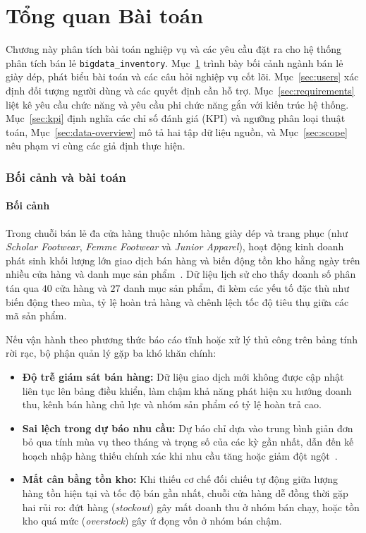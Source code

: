 \setcounter{page}{1}
\fancyfoot[C]{}
\part{Tổng quan Bài toán}
\label{part:ch1}

Chương này phân tích bài toán nghiệp vụ và các yêu cầu đặt ra cho hệ thống phân tích bán lẻ \texttt{bigdata_inventory}. Mục~\ref{sec:ch1-context} trình bày bối cảnh ngành bán lẻ giày dép, phát biểu bài toán và các câu hỏi nghiệp vụ cốt lõi. Mục~\ref{sec:users} xác định đối tượng người dùng và các quyết định cần hỗ trợ. Mục~\ref{sec:requirements} liệt kê yêu cầu chức năng và yêu cầu phi chức năng gắn với kiến trúc hệ thống. Mục~\ref{sec:kpi} định nghĩa các chỉ số đánh giá (KPI) và ngưỡng phân loại thuật toán, Mục~\ref{sec:data-overview} mô tả hai tập dữ liệu nguồn, và Mục~\ref{sec:scope} nêu phạm vi cùng các giả định thực hiện.

\section{Bối cảnh và bài toán}
\label{sec:ch1-context}

\subsection{Bối cảnh}
\label{sec:context}
Trong chuỗi bán lẻ đa cửa hàng thuộc nhóm hàng giày dép và trang phục (như \textit{Scholar Footwear}, \textit{Femme Footwear} và \textit{Junior Apparel}), hoạt động kinh doanh phát sinh khối lượng lớn giao dịch bán hàng và biến động tồn kho hằng ngày trên nhiều cửa hàng và danh mục sản phẩm~\cite{smith2026retail}. Dữ liệu lịch sử cho thấy doanh số phân tán qua $40$ cửa hàng và $27$ danh mục sản phẩm, đi kèm các yếu tố đặc thù như biến động theo mùa, tỷ lệ hoàn trả hàng và chênh lệch tốc độ tiêu thụ giữa các mã sản phẩm.

\medskip

Nếu vận hành theo phương thức báo cáo tĩnh hoặc xử lý thủ công trên bảng tính rời rạc, bộ phận quản lý gặp ba khó khăn chính:
\begin{itemize}[topsep=0pt, itemsep=1pt]
	\item \textbf{Độ trễ giám sát bán hàng:} Dữ liệu giao dịch mới không được cập nhật liên tục lên bảng điều khiển, làm chậm khả năng phát hiện xu hướng doanh thu, kênh bán hàng chủ lực và nhóm sản phẩm có tỷ lệ hoàn trả cao.
	\item \textbf{Sai lệch trong dự báo nhu cầu:} Dự báo chỉ dựa vào trung bình giản đơn bỏ qua tính mùa vụ theo tháng và trọng số của các kỳ gần nhất, dẫn đến kế hoạch nhập hàng thiếu chính xác khi nhu cầu tăng hoặc giảm đột ngột~\cite{hyndman2021forecasting}.
	\item \textbf{Mất cân bằng tồn kho:} Khi thiếu cơ chế đối chiếu tự động giữa lượng hàng tồn hiện tại và tốc độ bán gần nhất, chuỗi cửa hàng dễ đồng thời gặp hai rủi ro: đứt hàng (\textit{stockout}) gây mất doanh thu ở nhóm bán chạy, hoặc tồn kho quá mức (\textit{overstock}) gây ứ đọng vốn ở nhóm bán chậm.
\end{itemize}

